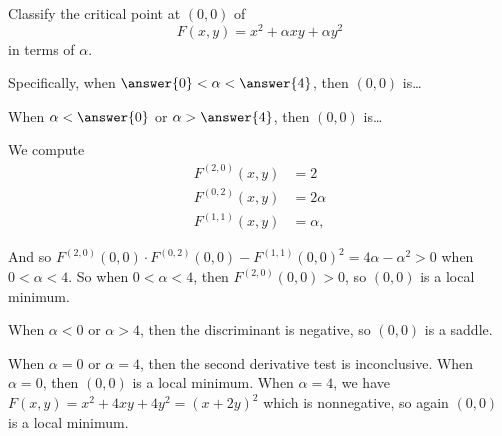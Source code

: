 \documentclass{ximera}
\author{Jim Fowler}
\begin{document}
\begin{exercise}

Classify the critical point at $(0,0)$ of
$$
F(x,y) = x^2 + \alpha x y + \alpha y^2
$$
in terms of $\alpha$.

Specifically, when $\answer{0} < \alpha< \answer{4}$, then $(0,0)$ is\ldots
\begin{multipleChoice}
\end{multipleChoice}

When $\alpha < \answer{0}$ or $\alpha > \answer{4}$, then $(0,0)$ is\ldots
\begin{multipleChoice}
\end{multipleChoice}

\begin{hint}
We compute 
\begin{align*}
  F^{(2,0)}(x,y) &= 2 \\
  F^{(0,2)}(x,y) &= 2 \alpha \\
  F^{(1,1)}(x,y) &= \alpha,
\end{align*}
\end{hint}
\begin{hint}
And so $F^{(2,0)}(0,0) \cdot F^{(0,2)}(0,0) - F^{(1,1)}(0,0)^2 = 4 \alpha - \alpha^2 > 0$ when $0 < \alpha 
< 4$.  So when $0 < \alpha< 4$, then $F^{(2,0)}(0,0) > 0$, so $(0,0)$ is a local minimum.
\end{hint}

\begin{hint}
When $\alpha < 0$ or $\alpha > 4$, then the discriminant is negative, so $(0,0)$ is a saddle.
\end{hint}

\begin{hint}
When $\alpha = 0$ or $\alpha = 4$, then the second derivative test is inconclusive.  When $\alpha = 0$, then $(0,0)$ is a local minimum.  When $\alpha = 4$, we have $F(x,y) = x^2 + 4xy + 4y^2 = (x + 2y)^2$ which is nonnegative, so again $(0,0)$ is a local minimum.
\end{hint}

\end{exercise}
\end{document}
